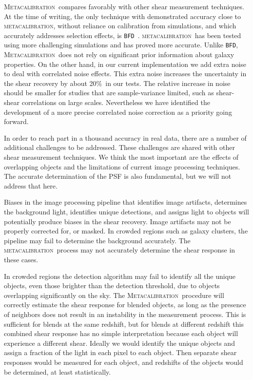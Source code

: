 \documentclass[iop]{emulateapj}
\newcommand{\degrade}{20\%}
\newcommand{\mcal}{\textsc{metacalibration}}
\newcommand{\Mcal}{\textsc{Metacalibration}}
\newcommand{\bfd}{\texttt{BFD}}
\begin{document}
\Mcal\ compares favorably with other shear measurement techniques.  At the time
of writing, the only technique with demonstrated accuracy close to \mcal,
without reliance on calibration from simulations, and which accurately
addresses selection effects, is \bfd\ \citep{bfd2016}.  \mcal\ has been tested
using more challenging simulations and has proved more accurate.  Unlike \bfd,
\Mcal\ does not rely on significant prior information about galaxy properties.
On the other hand, in our current implementation we add extra noise to deal
with correlated noise effects.  This extra noise increases the uncertainty in
the shear recovery by about \degrade\ in our tests. The relative increase in
noise should be smaller for studies that are sample-variance limited, such as
shear-shear correlations on large scales. Nevertheless we have identified the
development of a more precise correlated noise correction as a priority going
forward.

In order to reach part in a thousand accuracy in real data, there are a number
of additional challenges to be addressed.  These challenges are shared with
other shear measurement techniques.  We think the most important are the
effects of overlapping objects and the limitations of current image processing
techniques. The accurate determination of the PSF is also fundamental, but we
will not address that here.

Biases in the image processing pipeline that identifies image artifacts,
determines the background light, identifies unique detections, and assigns
light to objects will potentially produce biases in the shear recovery.  Image
artifacts may not be properly corrected for, or masked.  In crowded regions
such as galaxy clusters, the pipeline may fail to determine the background
accurately.  The \mcal\ process may not accurately determine the shear response
in these cases.

In crowded regions the detection algorithm may fail to identify all the unique
objects, even those brighter than the detection threshold, due to objects
overlapping significantly on the sky.  The \Mcal\ procedure will correctly
estimate the shear response for blended objects, as long as the presence of
neighbors does not result in an instability in the measurement process.  This
is sufficient for blends at the same redshift, but for blends at different
redshift this combined shear response has no simple interpretation because each
object will experience a different shear.  Ideally we would identify the unique
objects and assign a fraction of the light in each pixel to each object.  Then
separate shear responses would be measured for each object, and
redshifts of the objects would be determined, at least statistically.
\end{document}
